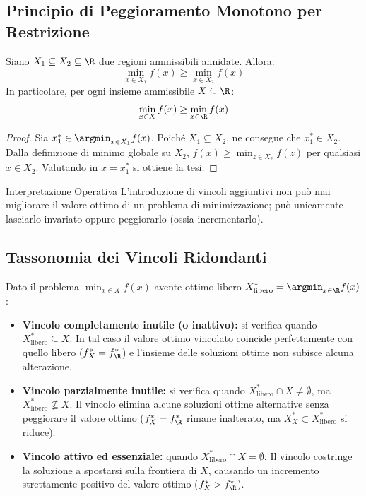 \subsection{Principio di Peggioramento Monotono per Restrizione}
\begin{theorem}
Siano $X_1 \subseteq X_2 \subseteq \R$ due regioni ammissibili annidate. Allora:
\begin{equation}
\min_{x \in X_1} f(x) \ge \min_{x \in X_2} f(x)
\end{equation}
In particolare, per ogni insieme ammissibile $X \subseteq \R$:
\begin{equation}
\min_{x \in X} f(x) \ge \min_{x \in \R} f(x)
\end{equation}
\end{theorem}
\begin{proof}
Sia $x_1^* \in \argmin_{x \in X_1} f(x)$. Poich\'e $X_1 \subseteq X_2$, ne consegue che $x_1^* \in X_2$. Dalla definizione di minimo globale su $X_2$, $f(x) \ge \min_{z \in X_2} f(z)$ per qualsiasi $x \in X_2$. Valutando in $x = x_1^*$ si ottiene la tesi.
\end{proof}

\begin{noteblock}{Interpretazione Operativa}
L'introduzione di vincoli aggiuntivi non pu\`o mai migliorare il valore ottimo di un problema di minimizzazione; pu\`o unicamente lasciarlo invariato oppure peggiorarlo (ossia incrementarlo).
\end{noteblock}

\subsection{Tassonomia dei Vincoli Ridondanti}
Dato il problema $\min_{x \in X} f(x)$ avente ottimo libero $X^*_{\text{libero}} = \argmin_{x \in \R} f(x)$:
\begin{itemize}
    \item \textbf{Vincolo completamente inutile (o inattivo):} si verifica quando $X^*_{\text{libero}} \subseteq X$. In tal caso il valore ottimo vincolato coincide perfettamente con quello libero ($f^*_X = f^*_{\R}$) e l'insieme delle soluzioni ottime non subisce alcuna alterazione.
    \item \textbf{Vincolo parzialmente inutile:} si verifica quando $X^*_{\text{libero}} \cap X \neq \emptyset$, ma $X^*_{\text{libero}} \not\subseteq X$. Il vincolo elimina alcune soluzioni ottime alternative senza peggiorare il valore ottimo ($f^*_X = f^*_{\R}$ rimane inalterato, ma $X^*_X \subset X^*_{\text{libero}}$ si riduce).
    \item \textbf{Vincolo attivo ed essenziale:} quando $X^*_{\text{libero}} \cap X = \emptyset$. Il vincolo costringe la soluzione a spostarsi sulla frontiera di $X$, causando un incremento strettamente positivo del valore ottimo ($f^*_X > f^*_{\R}$).
\end{itemize}

